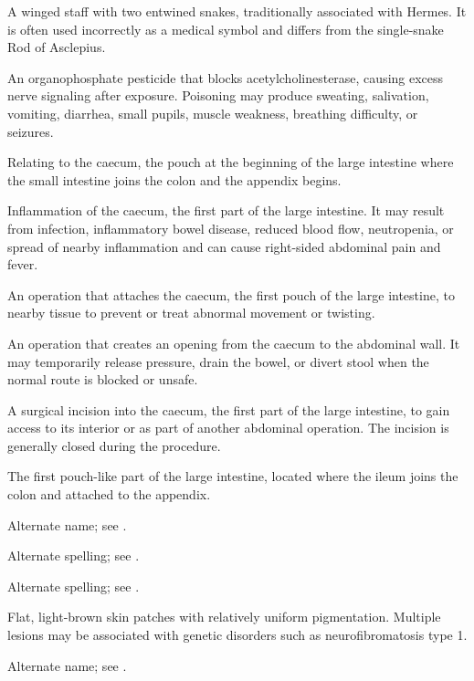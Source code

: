  A winged staff with two entwined snakes, traditionally associated with Hermes. It is often used incorrectly as a medical symbol and differs from the single-snake Rod of Asclepius.

 An organophosphate pesticide that blocks acetylcholinesterase, causing excess nerve signaling after exposure. Poisoning may produce sweating, salivation, vomiting, diarrhea, small pupils, muscle weakness, breathing difficulty, or seizures.

 Relating to the caecum, the pouch at the beginning of the large intestine where the small intestine joins the colon and the appendix begins.

 Inflammation of the caecum, the first part of the large intestine. It may result from infection, inflammatory bowel disease, reduced blood flow, neutropenia, or spread of nearby inflammation and can cause right-sided abdominal pain and fever.

 An operation that attaches the caecum, the first pouch of the large intestine, to nearby tissue to prevent or treat abnormal movement or twisting.

 An operation that creates an opening from the caecum to the abdominal wall. It may temporarily release pressure, drain the bowel, or divert stool when the normal route is blocked or unsafe.

 A surgical incision into the caecum, the first part of the large intestine, to gain access to its interior or as part of another abdominal operation. The incision is generally closed during the procedure.

 The first pouch-like part of the large intestine, located where the ileum joins the colon and attached to the appendix.

 Alternate name; see .

 Alternate spelling; see .

 Alternate spelling; see .

 Flat, light-brown skin patches with relatively uniform pigmentation. Multiple lesions may be associated with genetic disorders such as neurofibromatosis type 1.

 Alternate name; see .

